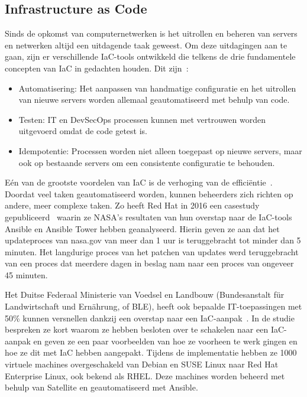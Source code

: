 \subsection{Infrastructure as Code}%
\label{sub:iac}

Sinds de opkomst van computernetwerken is het uitrollen en beheren van servers en netwerken altijd een uitdagende taak geweest.
Om deze uitdagingen aan te gaan, zijn er verschillende IaC-tools ontwikkeld die telkens de drie fundamentele concepten van IaC in gedachten houden.
Dit zijn~\autocite{chef-what-is-iac}:
\begin{itemize}
    \item Automatisering: Het aanpassen van handmatige configuratie en het uitrollen van nieuwe servers worden allemaal geautomatiseerd met behulp van code.
    \item Testen: IT en DevSecOps processen kunnen met vertrouwen worden uitgevoerd omdat de code getest is.
    \item Idempotentie: Processen worden niet alleen toegepast op nieuwe servers, maar ook op bestaande servers om een consistente configuratie te behouden.
\end{itemize}

E\'en van de grootste voordelen van IaC is de verhoging van de effici\"entie~\autocite{splunk-benefits-iac}.
Doordat veel taken geautomatiseerd worden, kunnen beheerders zich richten op andere, meer complexe taken.
Zo heeft Red Hat in 2016 een casestudy gepubliceerd~\autocite{case-study-nasa-iac} waarin ze NASA's resultaten van hun overstap naar de IaC-tools Ansible en Ansible Tower hebben geanalyseerd.
Hierin geven ze aan dat het updateproces van nasa.gov van meer dan 1 uur is teruggebracht tot minder dan 5 minuten.
Het langdurige proces van het patchen van updates werd teruggebracht van een proces dat meerdere dagen in beslag nam naar een proces van ongeveer 45 minuten.

Het Duitse Federaal Ministerie van Voedsel en Landbouw (Bundesanstalt f\"ur Landwirtschaft und Ern\"ahrung, of BLE), heeft ook bepaalde IT-toepassingen met 50\% kunnen versnellen dankzij een overstap naar een IaC-aanpak~\autocite{case-study-ble-iac}.
In de studie bespreken ze kort waarom ze hebben besloten over te schakelen naar een IaC-aanpak en geven ze een paar voorbeelden van hoe ze voorheen te werk gingen en hoe ze dit met IaC hebben aangepakt.
Tijdens de implementatie hebben ze 1000 virtuele machines overgeschakeld van Debian en SUSE Linux naar Red Hat Enterprise Linux, ook bekend als RHEL.
Deze machines worden beheerd met behulp van Satellite en geautomatiseerd met Ansible.

